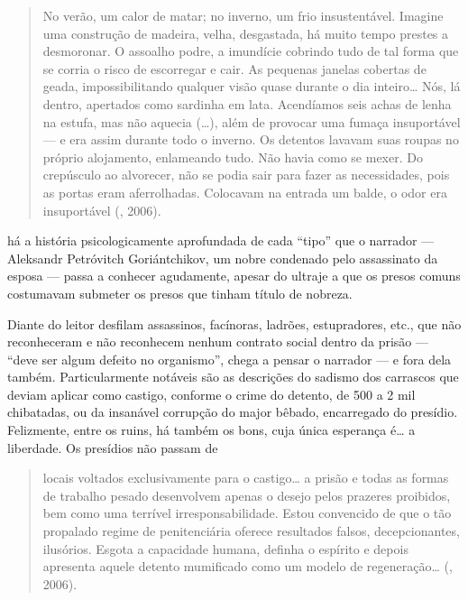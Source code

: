 \begin{quotation}
No verão, um calor de matar; no inverno, um frio insustentável.
Imagine uma construção de madeira, velha, desgastada, há muito tempo
prestes a desmoronar. O assoalho podre, a imundície cobrindo tudo de tal
forma que se corria o risco de escorregar e cair. As pequenas janelas
cobertas de geada, impossibilitando qualquer visão quase durante o dia
inteiro\ldots{} Nós, lá dentro, apertados como sardinha em lata. Acendíamos
seis achas de lenha na estufa, mas não aquecia (\ldots{}), além de provocar
uma fumaça insuportável --- e era assim durante todo o inverno. Os
detentos lavavam suas roupas no próprio alojamento, enlameando tudo. Não
havia como se mexer. Do crepúsculo ao alvorecer, não se podia sair para
fazer as necessidades, pois as portas eram aferrolhadas. Colocavam na
entrada um balde, o odor era insuportável (, 2006).
\end{quotation}

\noindent{}há a história psicologicamente aprofundada de cada ``tipo''
que o narrador --- Aleksandr Petróvitch Goriántchikov, um nobre
condenado pelo assassinato da esposa --- passa a conhecer agudamente, apesar do ultraje a que os presos comuns costumavam submeter os presos que tinham título de nobreza.

Diante do leitor desfilam assassinos, facínoras, ladrões,
estupradores, etc., que não reconheceram e não reconhecem
nenhum contrato social dentro da prisão --- ``deve ser algum
defeito no organismo'', chega a pensar o narrador --- e fora
dela também. Particularmente notáveis são as descrições do
sadismo dos carrascos que deviam aplicar como castigo,
conforme o crime do detento, de 500 a 2 mil chibatadas, ou da
insanável corrupção do major bêbado, encarregado do presídio. Felizmente,
entre os ruins, há também os bons, cuja única esperança é\ldots{} a liberdade. Os presídios não passam de

\begin{quotation}
locais voltados exclusivamente para o castigo\ldots{} a prisão e todas as formas de trabalho pesado desenvolvem apenas o desejo pelos prazeres proibidos, bem como uma terrível irresponsabilidade. Estou convencido de que o tão propalado regime de penitenciária oferece resultados falsos, decepcionantes, ilusórios. Esgota a capacidade humana, definha o espírito e depois apresenta aquele detento mumificado como um modelo de regeneração\ldots{} (, 2006).
\end{quotation}

